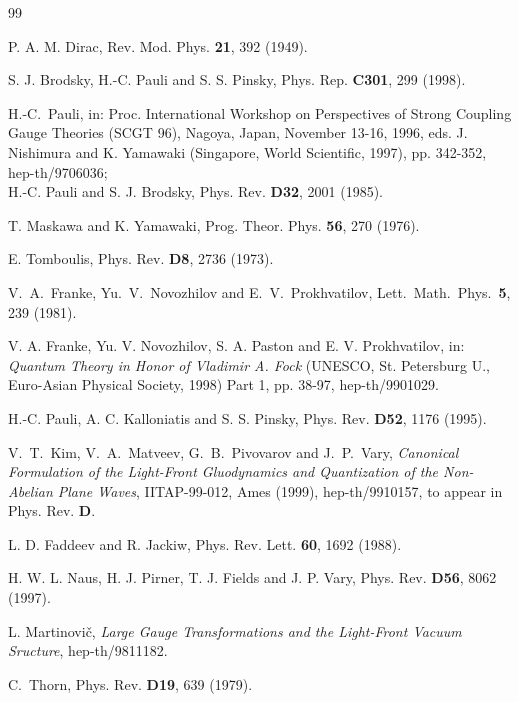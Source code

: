\documentclass[a4paper,12pt]{article}
\begin{document}
\begin{thebibliography} {99}

P. A. M. Dirac, Rev. Mod. Phys. {\bf 21}, 392 (1949).

S. J. Brodsky, H.-C. Pauli and S. S. Pinsky, Phys. Rep. {\bf C301}, 299 (1998).

H.-C.~Pauli,
in: Proc. International Workshop on Perspectives of Strong Coupling Gauge
Theories (SCGT 96), Nagoya, Japan, November 13-16, 1996, 
eds. J. Nishimura and K. Yamawaki (Singapore, World Scientific, 1997),
pp. 342-352, hep-th/9706036; \\
H.-C. Pauli and S. J. Brodsky, 
Phys. Rev. {\bf D32}, 2001 (1985). 

T. Maskawa and K. Yamawaki, Prog. Theor. Phys. {\bf 56}, 270 (1976). 

E. Tomboulis, Phys. Rev. {\bf D8}, 2736 (1973). 

V.~A.~Franke, Yu.~V.~Novozhilov and E.~V.~Prokhvatilov,
Lett.\ Math.\ Phys.\  {\bf 5}, 239 (1981).

V. A. Franke, Yu. V. Novozhilov, S. A. Paston and E. V. Prokhvatilov, 
in: {\it Quantum Theory in Honor of Vladimir A. Fock}
(UNESCO, St. Petersburg U., Euro-Asian Physical Society, 1998) Part 1, 
pp. 38-97, hep-th/9901029.

H.-C. Pauli, A. C. Kalloniatis and S. S. Pinsky, 
Phys. Rev. {\bf D52}, 1176 (1995). 

 V.~T.~Kim, V.~A.~Matveev, G.~B.~Pivovarov and J.~P.~Vary,
{\it Canonical Formulation of the Light-Front Gluodynamics
and Quantization of the Non-Abelian Plane Waves},
IITAP-99-012, Ames (1999), hep-th/9910157, 
to appear in Phys. Rev. {\bf D}. 

L. D. Faddeev and R. Jackiw, Phys. Rev. Lett. {\bf 60}, 1692 (1988).

H. W. L. Naus, H. J. Pirner, T. J. Fields and J. P. Vary,
Phys. Rev. {\bf D56}, 8062 (1997).

L. Martinovi\v{c}, {\it Large Gauge Transformations and the Light-Front
Vacuum Sructure}, hep-th/9811182.


C.~Thorn,
Phys. Rev. {\bf D19}, 639 (1979).



\end{thebibliography}
\end{document}
